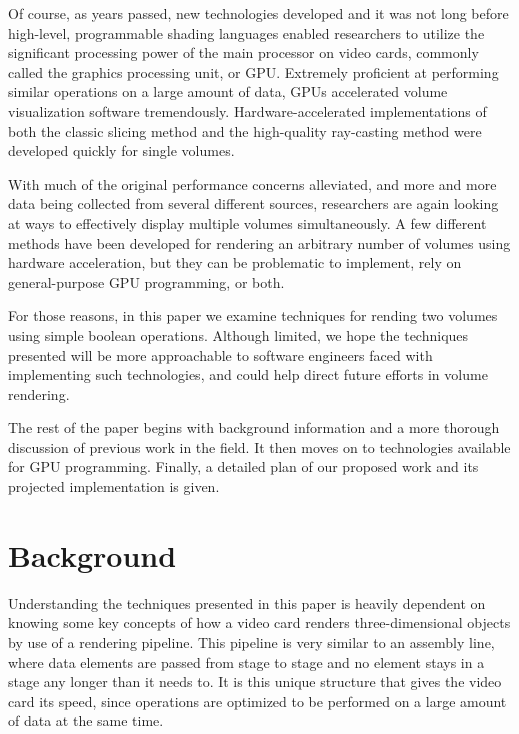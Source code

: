 \documentclass{article}
\begin{document}
Of course, as years passed, new technologies developed and it was not long
before high-level, programmable shading languages enabled researchers to utilize
the significant processing power of the main processor on video cards, commonly
called the graphics processing unit, or GPU.  Extremely proficient at performing
similar operations on a large amount of data, GPUs accelerated volume
visualization software tremendously.  Hardware-accelerated implementations of
both the classic slicing method and the high-quality ray-casting method were
developed quickly for single volumes.

With much of the original performance concerns alleviated, and more and more
data being collected from several different sources, researchers are again
looking at ways to effectively display multiple volumes simultaneously.  A few
different methods have been developed for rendering an arbitrary number of
volumes using hardware acceleration, but they can be problematic to implement,
rely on general-purpose GPU programming, or both.

For those reasons, in this paper we examine techniques for rending two volumes
using simple boolean operations.  Although limited, we hope the techniques
presented will be more approachable to software engineers faced with
implementing such technologies, and could help direct future efforts in volume
rendering.

The rest of the paper begins with background information and a more thorough
discussion of previous work in the field.  It then moves on to technologies
available for GPU programming.  Finally, a detailed plan of our proposed work
and its projected implementation is given.

\section{Background}

Understanding the techniques presented in this paper is heavily dependent on
knowing some key concepts of how a video card renders three-dimensional objects
by use of a rendering pipeline.  This pipeline is very similar to an assembly
line, where data elements are passed from stage to stage and no element stays in
a stage any longer than it needs to.  It is this unique structure that gives the
video card its speed, since operations are optimized to be performed on a large
amount of data at the same time.
\end{document}
